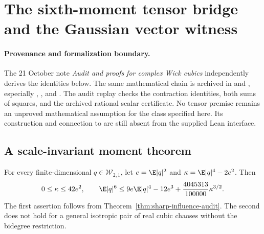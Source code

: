 \section{The sixth-moment tensor bridge and the Gaussian vector witness}
\label{sec:sixth-tensor-bridge-audit}

\paragraph{Provenance and formalization boundary.}
The 21 October note \emph{Audit and proofs for complex Wick cubics}
independently derives the identities below. The same mathematical chain
is archived in  and
, especially
,
, and
.
The audit replay checks the contraction identities, both sums of squares,
and the archived rational scalar certificate. No tensor premise remains
an unproved mathematical assumption for the class specified here.
Its construction and connection to 
are still absent from the supplied Lean interface.

\subsection{A scale-invariant moment theorem}
\begin{theorem}
\label{thm:sixth-tensor-bridge-audit}
For every finite-dimensional $q\in\mathcal W_{2,1}$, let
$e=\E|q|^2$ and $\kappa=\E|q|^4-2e^2$. Then
\[
 0\le\kappa\le42e^2,\qquad
 \E|q|^6\le9e\E|q|^4-12e^3+
             \frac{4045313}{100000}\kappa^{3/2}.
\]
The first assertion follows from Theorem~\ref{thm:sharp-influence-audit}.
The second does not hold for a general isotropic pair of real cubic
chaoses without the bidegree restriction.
\end{theorem}

